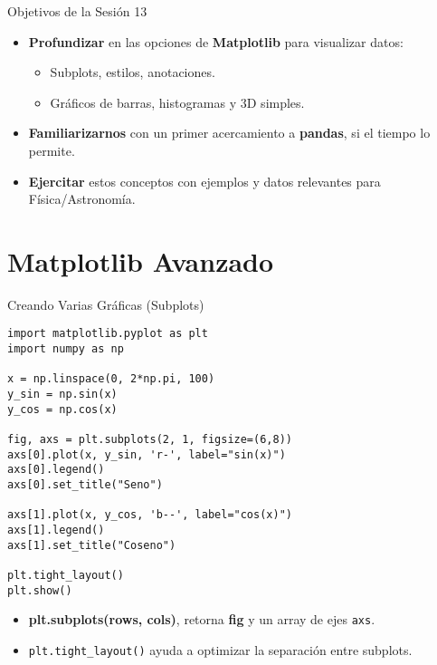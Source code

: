 \documentclass[10pt]{beamer}
\begin{document}
\begin{frame}{Objetivos de la Sesión 13}
  \begin{itemize}
    \item \textbf{Profundizar} en las opciones de \textbf{Matplotlib} para visualizar datos:
      \begin{itemize}
        \item Subplots, estilos, anotaciones.
        \item Gráficos de barras, histogramas y 3D simples.
      \end{itemize}
    \item \textbf{Familiarizarnos} con un primer acercamiento a \textbf{pandas}, si el tiempo lo permite.
    \item \textbf{Ejercitar} estos conceptos con ejemplos y datos relevantes para Física/Astronomía.
  \end{itemize}
\end{frame}

\section{Matplotlib Avanzado}

\begin{frame}[fragile]{Creando Varias Gráficas (Subplots)}
\begin{verbatim}
import matplotlib.pyplot as plt
import numpy as np

x = np.linspace(0, 2*np.pi, 100)
y_sin = np.sin(x)
y_cos = np.cos(x)

fig, axs = plt.subplots(2, 1, figsize=(6,8))
axs[0].plot(x, y_sin, 'r-', label="sin(x)")
axs[0].legend()
axs[0].set_title("Seno")

axs[1].plot(x, y_cos, 'b--', label="cos(x)")
axs[1].legend()
axs[1].set_title("Coseno")

plt.tight_layout()
plt.show()
\end{verbatim}
\begin{itemize}
  \item \textbf{plt.subplots(rows, cols)}, retorna \textbf{fig} y un array de ejes \texttt{axs}.
  \item \texttt{plt.tight\_layout()} ayuda a optimizar la separación entre subplots.
\end{itemize}
\end{frame}
\end{document}
